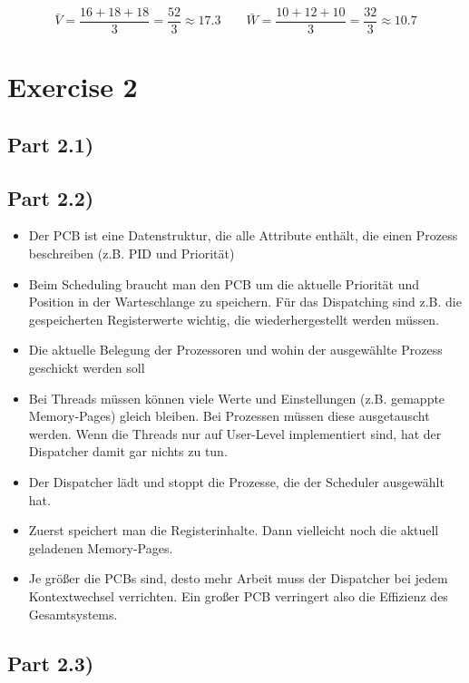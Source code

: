 \documentclass[10pt,a4paper]{article}
\begin{document}
\begin{equation*}
  \bar{V} = \frac{16 + 18 + 18}{3} = \frac{52}{3} \approx 17.3 \qquad \bar{W} = \frac{10 + 12 + 10}{3} = \frac{32}{3} \approx 10.7
\end{equation*}

\section*{Exercise 2}

\subsection*{Part 2.1)}

\subsection*{Part 2.2)}

\begin{itemize}
\item Der PCB ist eine Datenstruktur, die alle Attribute enthält, die einen Prozess beschreiben (z.B. PID und Priorität)
\item Beim Scheduling braucht man den PCB um die aktuelle Priorität und Position in der Warteschlange zu speichern.
  Für das Dispatching sind z.B. die gespeicherten Registerwerte wichtig, die wiederhergestellt werden müssen.
\item Die aktuelle Belegung der Prozessoren und wohin der ausgewählte Prozess geschickt werden soll
\item Bei Threads müssen können viele Werte und Einstellungen (z.B. gemappte Memory-Pages) gleich bleiben.
  Bei Prozessen müssen diese ausgetauscht werden.
  Wenn die Threads nur auf User-Level implementiert sind, hat der Dispatcher damit gar nichts zu tun.
\item Der Dispatcher lädt und stoppt die Prozesse, die der Scheduler ausgewählt hat.
\item Zuerst speichert man die Registerinhalte.
  Dann vielleicht noch die aktuell geladenen Memory-Pages.
\item Je größer die PCBs sind, desto mehr Arbeit muss der Dispatcher bei jedem Kontextwechsel verrichten.
  Ein großer PCB verringert also die Effizienz des Gesamtsystems.
\end{itemize}

\subsection*{Part 2.3)}
\end{document}

